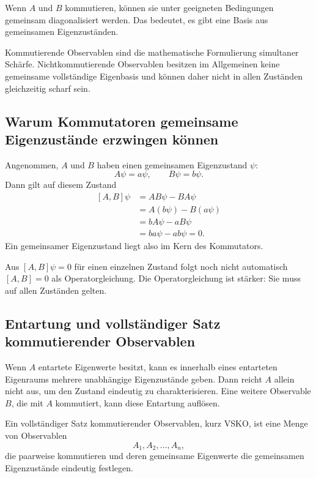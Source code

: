 Wenn $A$ und $B$ kommutieren, können sie unter geeigneten Bedingungen gemeinsam diagonalisiert werden. Das bedeutet, es gibt eine Basis aus gemeinsamen Eigenzuständen.

\begin{conceptbox}
Kommutierende Observablen sind die mathematische Formulierung simultaner Schärfe. Nichtkommutierende Observablen besitzen im Allgemeinen keine gemeinsame vollständige Eigenbasis und können daher nicht in allen Zuständen gleichzeitig scharf sein.
\end{conceptbox}

\subsection{Warum Kommutatoren gemeinsame Eigenzustände erzwingen können}

Angenommen, $A$ und $B$ haben einen gemeinsamen Eigenzustand $\psi$:
\[
    A\psi=a\psi,
    \qquad
    B\psi=b\psi.
\]
Dann gilt auf diesem Zustand
\[
\begin{aligned}
    [A,B]\psi
    &=AB\psi-BA\psi \\
    &=A(b\psi)-B(a\psi) \\
    &=bA\psi-aB\psi \\
    &=ba\psi-ab\psi=0.
\end{aligned}
\]
Ein gemeinsamer Eigenzustand liegt also im Kern des Kommutators.

\begin{notebox}
Aus $[A,B]\psi=0$ für einen einzelnen Zustand folgt noch nicht automatisch $[A,B]=0$ als Operatorgleichung. Die Operatorgleichung ist stärker: Sie muss auf allen Zuständen gelten.
\end{notebox}

\subsection{Entartung und vollständiger Satz kommutierender Observablen}

Wenn $A$ entartete Eigenwerte besitzt, kann es innerhalb eines entarteten Eigenraums mehrere unabhängige Eigenzustände geben. Dann reicht $A$ allein nicht aus, um den Zustand eindeutig zu charakterisieren. Eine weitere Observable $B$, die mit $A$ kommutiert, kann diese Entartung auflösen.

\begin{definitionbox}
Ein vollständiger Satz kommutierender Observablen, kurz VSKO, ist eine Menge von Observablen
\[
    A_1,A_2,\dots,A_n,
\]
die paarweise kommutieren und deren gemeinsame Eigenwerte die gemeinsamen Eigenzustände eindeutig festlegen.
\end{definitionbox}

